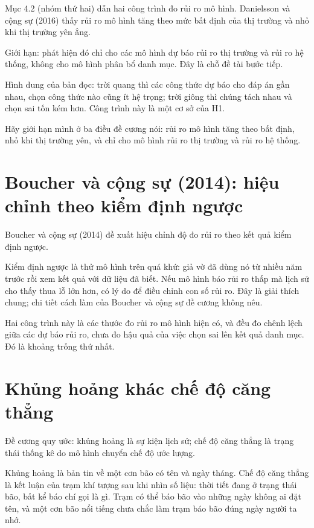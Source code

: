 Mục 4.2 (nhóm thứ hai) dẫn hai công trình đo rủi ro mô hình. Danielsson và cộng sự (2016) thấy rủi ro mô hình tăng theo mức bất định của thị trường và nhỏ khi thị trường yên ắng.

Giới hạn: phát hiện đó chỉ cho các mô hình dự báo rủi ro thị trường và rủi ro hệ thống, không cho mô hình phân bổ danh mục. Đây là chỗ đề tài bước tiếp.

Hình dung của bản đọc: trời quang thì các công thức dự báo cho đáp án gần nhau, chọn công thức nào cũng ít hệ trọng; trời giông thì chúng tách nhau và chọn sai tốn kém hơn. Công trình này là một cơ sở của H1.

Hãy giới hạn mình ở ba điều đề cương nói: rủi ro mô hình tăng theo bất định, nhỏ khi thị trường yên, và chỉ cho mô hình rủi ro thị trường và rủi ro hệ thống.

\section{Boucher và cộng sự (2014): hiệu chỉnh theo kiểm định ngược}

Boucher và cộng sự (2014) đề xuất hiệu chỉnh độ đo rủi ro theo kết quả kiểm định ngược.

Kiểm định ngược là thử mô hình trên quá khứ: giả vờ đã dùng nó từ nhiều năm trước rồi xem kết quả với dữ liệu đã biết. Nếu mô hình báo rủi ro thấp mà lịch sử cho thấy thua lỗ lớn hơn, có lý do để điều chỉnh con số rủi ro. Đây là giải thích chung; chi tiết cách làm của Boucher và cộng sự đề cương không nêu.

Hai công trình này là các thước đo rủi ro mô hình hiện có, và đều đo chênh lệch giữa các dự báo rủi ro, chưa đo hậu quả của việc chọn sai lên kết quả danh mục. Đó là khoảng trống thứ nhất.

\section{Khủng hoảng khác chế độ căng thẳng}

Đề cương quy ước: khủng hoảng là sự kiện lịch sử; chế độ căng thẳng là trạng thái thống kê do mô hình chuyển chế độ ước lượng.

Khủng hoảng là bản tin về một cơn bão có tên và ngày tháng. Chế độ căng thẳng là kết luận của trạm khí tượng sau khi nhìn số liệu: thời tiết đang ở trạng thái bão, bất kể báo chí gọi là gì. Trạm có thể báo bão vào những ngày không ai đặt tên, và một cơn bão nổi tiếng chưa chắc làm trạm báo bão đúng ngày người ta nhớ.

